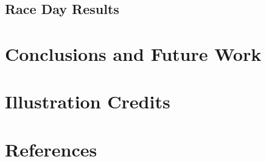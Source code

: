 \documentclass[12pt]{article}
\begin{document}
\subsection{Race Day Results}

\section{Conclusions and Future Work}

\section{Illustration Credits}

\section{References}
\end{document}
